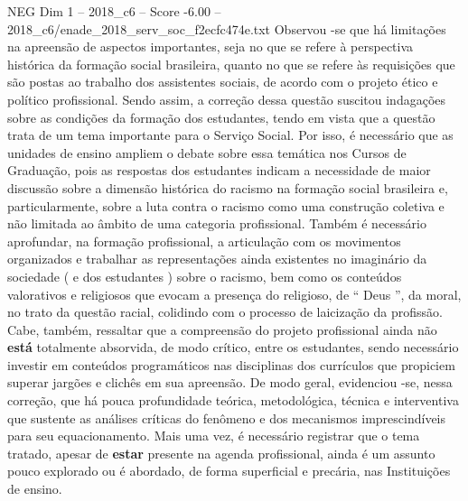 \begin{textsample}{NEG Dim 1 – 2018\_c6 – Score -6.00 – 2018\_c6/enade\_2018\_serv\_soc\_f2ecfc474e.txt}
Observou -se que há limitações na apreensão de aspectos importantes, seja no que se refere à perspectiva histórica da formação social brasileira, quanto no que se refere às requisições que são postas ao trabalho dos assistentes sociais, de acordo com o projeto ético e político profissional.
Sendo assim, a correção dessa questão suscitou indagações sobre as condições da formação dos estudantes, tendo em vista que a questão trata de um tema importante para o Serviço Social.
Por isso, é necessário que as unidades de ensino ampliem o debate sobre essa temática nos Cursos de Graduação, pois as respostas dos estudantes indicam a necessidade de maior discussão sobre a dimensão histórica do racismo na formação social brasileira e, particularmente, sobre a luta contra o racismo como uma construção coletiva e não limitada ao âmbito de uma categoria profissional.
Também é necessário aprofundar, na formação profissional, a articulação com os movimentos organizados e trabalhar as representações ainda existentes no imaginário da sociedade ( e dos estudantes ) sobre o racismo, bem como os conteúdos valorativos e religiosos que evocam a presença do religioso, de “ Deus ”, da moral, no trato da questão racial, colidindo com o processo de laicização da profissão.
Cabe, também, ressaltar que a compreensão do projeto profissional ainda não \textbf{está} totalmente absorvida, de modo crítico, entre os estudantes, sendo necessário investir em conteúdos programáticos nas disciplinas dos currículos que propiciem superar jargões e clichês em sua apreensão.
De modo geral, evidenciou -se, nessa correção, que há pouca profundidade teórica, metodológica, técnica e interventiva que sustente as análises críticas do fenômeno e dos mecanismos imprescindíveis para seu equacionamento.
Mais uma vez, é necessário registrar que o tema tratado, apesar de \textbf{estar} presente na agenda profissional, ainda é um assunto pouco explorado ou é abordado, de forma superficial e precária, nas Instituições de ensino.

\end{textsample}
